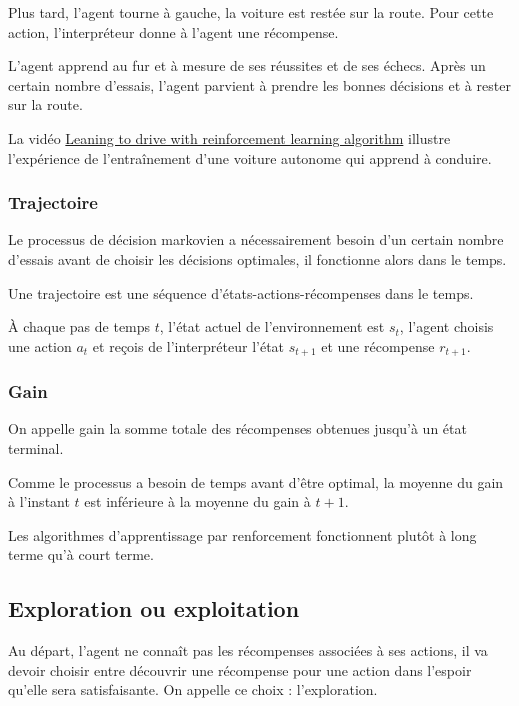 \documentclass[
12pt,
french,
]{article}
\begin{document}
Plus tard, l'agent tourne à gauche, la voiture est restée sur la route.
Pour cette action, l'interpréteur donne à l'agent une récompense.

L'agent apprend au fur et à mesure de ses réussites et de ses échecs.
Après un certain nombre d'essais, l'agent parvient à prendre les bonnes
décisions et à rester sur la route.

La vidéo \href{https://www.youtube.com/watch?v=eRwTbRtnT1I}{Leaning to
drive with reinforcement learning algorithm} illustre l'expérience de
l'entraînement d'une voiture autonome qui apprend à conduire.

\hypertarget{trajectoire}{%
\subsubsection{Trajectoire}\label{trajectoire}}

Le processus de décision markovien a nécessairement besoin d'un certain
nombre d'essais avant de choisir les décisions optimales, il fonctionne
alors dans le temps.

Une trajectoire est une séquence d'états-actions-récompenses dans le
temps.

À chaque pas de temps \(t\), l'état actuel de l'environnement est
\(s_t\), l'agent choisis une action \(a_t\) et reçois de l'interpréteur
l'état \(s_{t+1}\) et une récompense \(r_{t+1}\).

\hypertarget{gain}{%
\subsubsection{Gain}\label{gain}}

On appelle gain la somme totale des récompenses obtenues jusqu'à un état
terminal.

Comme le processus a besoin de temps avant d'être optimal, la moyenne du
gain à l'instant \(t\) est inférieure à la moyenne du gain à \(t+1\).

Les algorithmes d'apprentissage par renforcement fonctionnent plutôt à
long terme qu'à court terme.

\hypertarget{exploration-ou-exploitation}{%
\subsection{Exploration ou
exploitation}\label{exploration-ou-exploitation}}

Au départ, l'agent ne connaît pas les récompenses associées à ses
actions, il va devoir choisir entre découvrir une récompense pour une
action dans l'espoir qu'elle sera satisfaisante. On appelle ce choix :
l'exploration.
\end{document}
